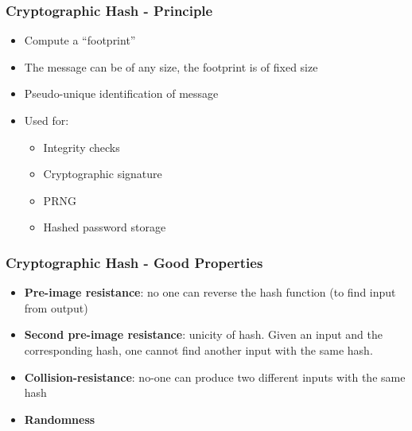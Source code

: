 \documentclass[
hyperref={pdfpagelabels=false}
,xcolor=table
]
{beamer}
\begin{document}
\begin{frame}
  \frametitle{Cryptographic Hash - Principle}

  \begin{itemize}
  \item Compute a ``footprint''
  \item The message can be of any size, the footprint is of fixed size
  \item Pseudo-unique identification of message
  \item Used for:
    \begin{itemize}
    \item Integrity checks
    \item Cryptographic signature
    \item PRNG
    \item Hashed password storage
    \end{itemize}
  \end{itemize}
\end{frame}


\begin{frame}
  \frametitle{Cryptographic Hash - Good Properties}

  \begin{itemize}
  \item \textbf{Pre-image resistance}: no one can reverse the hash function (to find input from output)
  \item \textbf{Second pre-image resistance}: unicity of hash. Given an input and the corresponding hash, one cannot find another input with the same hash. 
  \item \textbf{Collision-resistance}: no-one can produce two different inputs with the same hash
  \item \textbf{Randomness}
  \end{itemize}
\end{frame}
\end{document}
